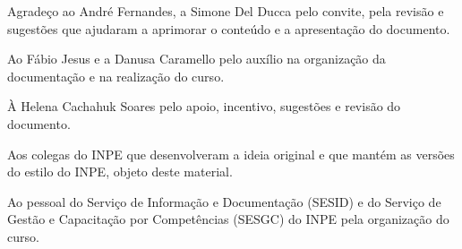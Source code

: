 
\begin{agradecimentos}  %

\hypertarget{estilo:agradecimentos}{} %
Agradeço ao André Fernandes, a Simone Del Ducca pelo convite, pela revisão e sugestões que ajudaram a aprimorar  o conteúdo e a apresentação do documento. 

Ao Fábio Jesus e a Danusa Caramello pelo auxílio na organização da documentação e na realização do curso. 

À Helena Cachahuk Soares pelo apoio, incentivo, sugestões e revisão do documento.

Aos colegas do INPE que desenvolveram a ideia original e que mantém as versões do estilo do INPE, objeto deste material.

Ao pessoal do Serviço de Informação e Documentação (SESID) e do Serviço de Gestão e Capacitação por Competências (SESGC) do INPE pela organização do curso.

\end{agradecimentos}